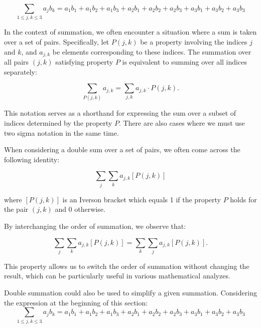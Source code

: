     
$$\sum_{1 \leq j, k \leq 3} a_j b_k = a_1b_1 + a_1b_2 + a_1b_3 + a_2b_1 + a_2b_2 + a_2b_3 + a_3b_1 + a_3b_2 + a_3b_3 $$


In the context of summation, we often encounter a situation where a sum is taken over a set of pairs. Specifically, let \( P(j, k) \) be a property involving the indices \( j \) and \( k \), and \( a_{j,k} \) be elements corresponding to these indices. The summation over all pairs \( (j, k) \) satisfying property \( P \) is equivalent to summing over all indices separately:

\[
\sum_{P(j,k)} a_{j,k} = \sum_{j,k} a_{j,k} \cdot P(j,k).
\]

This notation serves as a shorthand for expressing the sum over a subset of indices determined by the property \( P \).
There are also cases where we must use two sigma notation in the same time.

 
\begin{example}
    When considering a double sum over a set of pairs, we often come across the following identity:

\begin{equation}
\sum_{j}\sum_{k} a_{j,k} [P(j,k)]
\end{equation}

where \( [P(j,k)] \) is an Iverson bracket which equals 1 if the property \( P \) holds for the pair \( (j,k) \) and 0 otherwise.
\end{example}


By interchanging the order of summation, we observe that:

\begin{equation}
\sum_{j}\sum_{k} a_{j,k} [P(j,k)] = \sum_{k}\sum_{j} a_{j,k} [P(j,k)].
\end{equation}

This property allows us to switch the order of summation without changing the result, which can be particularly useful in various mathematical analyzes.

Double summation could also be used to simplify a given summation.
Considering the expression at the beginning of this section:
$$\sum_{1 \leq j, k \leq 3} a_j b_k = a_1b_1 + a_1b_2 + a_1b_3 + a_2b_1 + a_2b_2 + a_2b_3 + a_3b_1 + a_3b_2 + a_3b_3 $$

